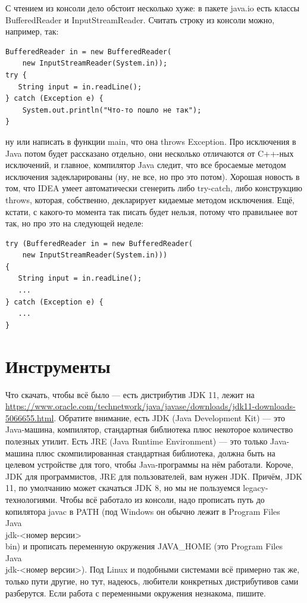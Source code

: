 \documentclass[a5paper]{article}
\begin{document}
С чтением из консоли дело обстоит несколько хуже: в пакете java.io есть классы BufferedReader и InputStreamReader. Считать строку из консоли можно, например, так:

\begin{verbatim}
BufferedReader in = new BufferedReader(
    new InputStreamReader(System.in));
try {
   String input = in.readLine();
} catch (Exception e) {
    System.out.println("Что-то пошло не так");
}
\end{verbatim}

ну или написать в функции main, что она throws Exception. Про исключения в Java потом будет рассказано отдельно, они несколько отличаются от C++-ных исключений, и главное, компилятор Java следит, что все бросаемые методом исключения задекларированы (ну, не все, но про это потом). Хорошая новость в том, что IDEA умеет автоматически сгенерить либо try-catch, либо конструкцию throws, которая, собственно, декларирует кидаемые методом исключения. Ещё, кстати, с какого-то момента так писать будет нельзя, потому что правильнее вот так, но про это на следующей неделе:

\begin{verbatim}
try (BufferedReader in = new BufferedReader(
    new InputStreamReader(System.in))) 
{
   String input = in.readLine();
   ...
} catch (Exception e) {
   ...
}
\end{verbatim}

\section{Инструменты}

Что скачать, чтобы всё было --- есть дистрибутив JDK 11, лежит на \url{https://www.oracle.com/technetwork/java/javase/downloads/jdk11-downloads-5066655.html}. Обратите внимание, есть JDK (Java Development Kit) --- это Java-машина, компилятор, стандартная библиотека плюс некоторое количество полезных утилит. Есть JRE (Java Runtime Environment) --- это только Java-машина плюс скомпилированная стандартная библиотека, должна быть на целевом устройстве для того, чтобы Java-программы на нём работали. Короче, JDK для программистов, JRE для пользователей, вам нужен JDK. Причём, JDK 11, по умолчанию может скачаться JDK 8, но мы не пользуемся legacy-технологиями. Чтобы всё работало из консоли, надо прописать путь до копилятора javac в PATH (под Windows он обычно лежит в Program Files\\Java\\jdk-<номер версии>\\bin) и прописать переменную окружения JAVA\_HOME (это Program Files\\Java\\jdk-<номер версии>). Под Linux и подобными системами всё примерно так же, только пути другие, но тут, надеюсь, любители конкретных дистрибутивов сами разберутся. Если работа с переменными окружения незнакома, пишите.
\end{document}

